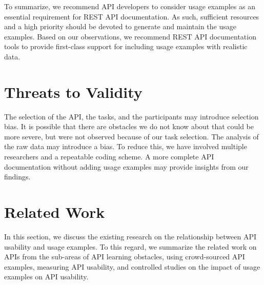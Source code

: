 \vspace{1mm}
\hspace{-5mm}
\vspace{0.5mm}

To summarize, we recommend API developers to consider usage examples as an essential requirement for REST API documentation. As such, sufficient resources and a high priority should be devoted to generate and maintain the usage examples. Based on our observations, we recommend REST API documentation tools to provide first-class support for including usage examples with realistic data.

\section{Threats to Validity}
\label{sec:threat}
The selection of the API, the tasks, and the participants may introduce selection bias. It is possible that there are obstacles we do not know about that could be more severe, but were not observed because of our task selection. The analysis of the raw data may introduce a bias. To reduce this, we have involved multiple researchers and a repeatable coding scheme. A more complete API documentation without adding usage examples may provide  insights from our findings.

\section{Related Work}
\label{sec:related_work}

In this section, we discuss the existing research on the relationship between API usability and usage examples. To this regard, we summarize the related work on APIs from the sub-areas of API learning obstacles, using crowd-sourced API examples, measuring API usability, and controlled studies on the impact of usage examples on API usability.


